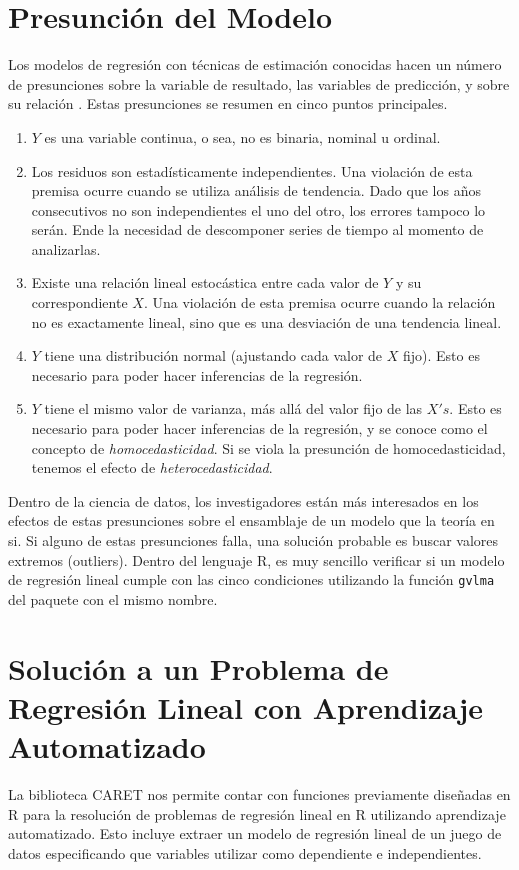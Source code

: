 \documentclass[letterpaper, spanish, 11pt]{report}
\begin{document}
\section{Presunción del Modelo}
Los modelos de regresión con técnicas de estimación conocidas hacen un número de presunciones sobre la variable de resultado, las variables de predicción, y sobre su relación \cite{daroczi}. Estas presunciones se resumen en cinco puntos principales.

\begin{enumerate}
	\item $Y$ es una variable continua, o sea, no es binaria, nominal u ordinal.
	\item Los residuos son estadísticamente independientes. Una violación de esta premisa ocurre cuando se utiliza análisis de tendencia. Dado que los años consecutivos no son independientes el uno del otro, los errores tampoco lo serán. Ende la necesidad de descomponer series de tiempo al momento de analizarlas. 
	\item Existe una relación lineal estocástica entre cada valor de $Y$ y su correspondiente $X$. Una violación de esta premisa ocurre cuando la relación no es exactamente lineal, sino que es una desviación de una tendencia lineal. 
	\item $Y$ tiene una distribución normal (ajustando cada valor de $X$ fijo). Esto es necesario para poder hacer inferencias de la regresión.
	\item $Y$ tiene el mismo valor de varianza, más allá del valor fijo de las $X's$. Esto es necesario para poder hacer inferencias de la regresión, y se conoce como el concepto de \emph{homocedasticidad}. Si se viola la presunción de homocedasticidad, tenemos el efecto de \emph{heterocedasticidad}.
\end{enumerate}

Dentro de la ciencia de datos, los investigadores están más interesados en los efectos de estas presunciones sobre el ensamblaje de un modelo que la teoría en si. Si alguno de estas presunciones falla, una solución probable es buscar valores extremos (outliers). Dentro del lenguaje R, es muy sencillo verificar si un modelo de regresión lineal cumple con las cinco condiciones utilizando la función \texttt{gvlma} del paquete con el mismo nombre.

\section{Solución a un Problema de Regresión Lineal con Aprendizaje Automatizado}
La biblioteca CARET nos permite contar con funciones previamente diseñadas en R para la resolución de problemas de regresión lineal en R utilizando aprendizaje automatizado. Esto incluye extraer un modelo de regresión lineal de un juego de datos especificando que variables utilizar como dependiente e independientes. 
\end{document}
